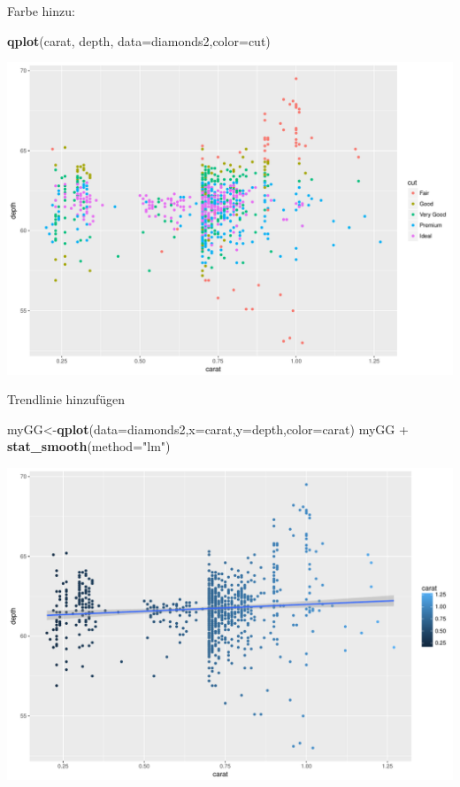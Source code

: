 \documentclass[ignorenonframetext,]{beamer}
\newenvironment{Shaded}{}{}
\newcommand{\KeywordTok}[1]{\textcolor[rgb]{0.00,0.44,0.13}{\textbf{{#1}}}}
\newcommand{\DataTypeTok}[1]{\textcolor[rgb]{0.56,0.13,0.00}{{#1}}}
\newcommand{\StringTok}[1]{\textcolor[rgb]{0.25,0.44,0.63}{{#1}}}
\newcommand{\NormalTok}[1]{{#1}}
\begin{document}
\begin{frame}[fragile]{Farbe hinzu:}

\begin{Shaded}
\begin{Highlighting}[]
\KeywordTok{qplot}\NormalTok{(carat, depth, }\DataTypeTok{data=}\NormalTok{diamonds2,}\DataTypeTok{color=}\NormalTok{cut)}
\end{Highlighting}
\end{Shaded}

\includegraphics{RSocialScience2_files/figure-beamer/unnamed-chunk-15-1.pdf}

\end{frame}

\begin{frame}[fragile]{Trendlinie hinzufügen}

\begin{Shaded}
\begin{Highlighting}[]
\NormalTok{myGG<-}\KeywordTok{qplot}\NormalTok{(}\DataTypeTok{data=}\NormalTok{diamonds2,}\DataTypeTok{x=}\NormalTok{carat,}\DataTypeTok{y=}\NormalTok{depth,}\DataTypeTok{color=}\NormalTok{carat) }
\NormalTok{myGG +}\StringTok{ }\KeywordTok{stat_smooth}\NormalTok{(}\DataTypeTok{method=}\StringTok{"lm"}\NormalTok{)}
\end{Highlighting}
\end{Shaded}

\includegraphics{RSocialScience2_files/figure-beamer/unnamed-chunk-16-1.pdf}

\end{frame}
\end{document}
